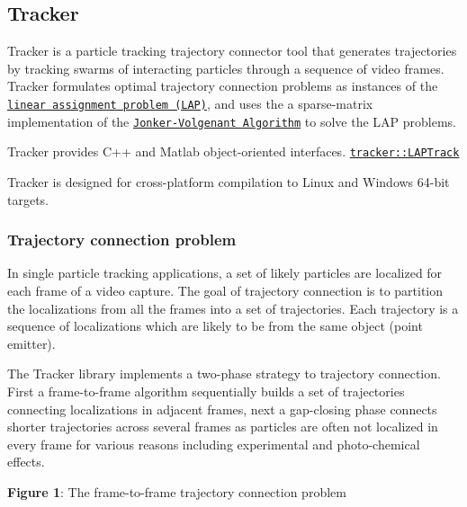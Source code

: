 \href{https://travis-ci.org/markjolah/Tracker}{\tt } \subsection*{Tracker}

Tracker is a particle tracking trajectory connector tool that generates trajectories by tracking swarms of interacting particles through a sequence of video frames. Tracker formulates optimal trajectory connection problems as instances of the \href{https://en.wikipedia.org/wiki/Assignment_problem}{\tt linear assignment problem (L\+AP)}, and uses the a sparse-\/matrix implementation of the \href{https://dl.acm.org/citation.cfm?id=30107}{\tt Jonker-\/\+Volgenant Algorithm} to solve the L\+AP problems.
\begin{DoxyItemize}
\item Tracker provides C++ and Matlab object-\/oriented interfaces. \href{http://markolah.pecos.us/Tracker/classtracker_1_1LAPTrack.html}{\tt {\ttfamily tracker\+::\+L\+A\+P\+Track}}
\item Tracker is designed for cross-\/platform compilation to Linux and Windows 64-\/bit targets.
\end{DoxyItemize}

\subsubsection*{Trajectory connection problem}

In single particle tracking applications, a set of likely particles are localized for each frame of a video capture. The goal of trajectory connection is to partition the localizations from all the frames into a set of trajectories. Each trajectory is a sequence of localizations which are likely to be from the same object (point emitter).

The Tracker library implements a two-\/phase strategy to trajectory connection. First a frame-\/to-\/frame algorithm sequentially builds a set of trajectories connecting localizations in adjacent frames, next a gap-\/closing phase connects shorter trajectories across several frames as particles are often not localized in every frame for various reasons including experimental and photo-\/chemical effects.

\href{https://raw.githubusercontent.com/markjolah/Tracker/master/doc/images/tracker_problem.png}{\tt } 

{\bfseries Figure 1}\+: The frame-\/to-\/frame trajectory connection problem 


